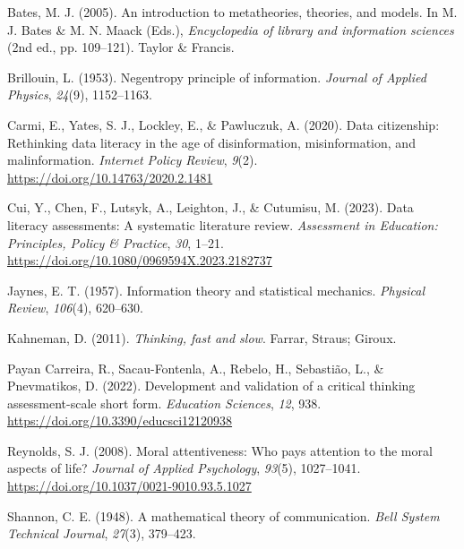 \documentclass[
  12pt,
  a4paper,
  twoside]{article}
\newlength{\cslhangindent}
\newlength{\cslentryspacingunit} %
\newenvironment{CSLReferences}[2] %
 {%
  \setlength{\parindent}{0pt}
  \ifodd #1
  \let\oldpar\par
  \def\par{\hangindent=\cslhangindent\oldpar}
  \fi
  \setlength{\parskip}{#2\cslentryspacingunit}
 }%
 {}
\begin{document}
\hypertarget{refs}{}
\begin{CSLReferences}{1}{0}
\leavevmode{}%
Bates, M. J. (2005). An introduction to metatheories, theories, and models. In M. J. Bates \& M. N. Maack (Eds.), \emph{Encyclopedia of library and information sciences} (2nd ed., pp. 109--121). Taylor \& Francis.

\leavevmode{}%
Brillouin, L. (1953). Negentropy principle of information. \emph{Journal of Applied Physics}, \emph{24}(9), 1152--1163.

\leavevmode{}%
Carmi, E., Yates, S. J., Lockley, E., \& Pawluczuk, A. (2020). Data citizenship: Rethinking data literacy in the age of disinformation, misinformation, and malinformation. \emph{Internet Policy Review}, \emph{9}(2). \url{https://doi.org/10.14763/2020.2.1481}

\leavevmode{}%
Cui, Y., Chen, F., Lutsyk, A., Leighton, J., \& Cutumisu, M. (2023). Data literacy assessments: A systematic literature review. \emph{Assessment in Education: Principles, Policy \& Practice}, \emph{30}, 1--21. \url{https://doi.org/10.1080/0969594X.2023.2182737}

\leavevmode{}%
Jaynes, E. T. (1957). Information theory and statistical mechanics. \emph{Physical Review}, \emph{106}(4), 620--630.

\leavevmode{}%
Kahneman, D. (2011). \emph{Thinking, fast and slow}. Farrar, Straus; Giroux.

\leavevmode{}%
Payan Carreira, R., Sacau-Fontenla, A., Rebelo, H., Sebastião, L., \& Pnevmatikos, D. (2022). Development and validation of a critical thinking assessment-scale short form. \emph{Education Sciences}, \emph{12}, 938. \url{https://doi.org/10.3390/educsci12120938}

\leavevmode{}%
Reynolds, S. J. (2008). Moral attentiveness: Who pays attention to the moral aspects of life? \emph{Journal of Applied Psychology}, \emph{93}(5), 1027--1041. \url{https://doi.org/10.1037/0021-9010.93.5.1027}

\leavevmode{}%
Shannon, C. E. (1948). A mathematical theory of communication. \emph{Bell System Technical Journal}, \emph{27}(3), 379--423.

\end{CSLReferences}
\end{document}

